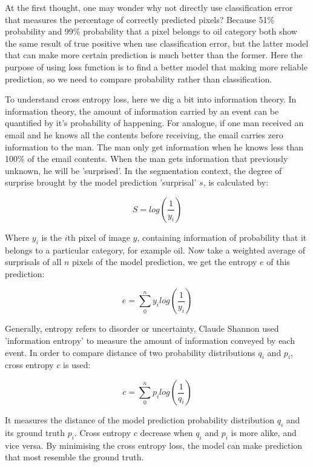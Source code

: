 At the first thought, one may wonder why not directly use classification error that measures the percentage of correctly predicted pixels? Because 51\% probability and 99\% probability that a pixel belongs to oil category both show the same result of true positive when use classification error, but the latter model that can make more certain prediction is much better than the former. Here the purpose of using loss function is to find a better model that making more reliable prediction, so we need to compare probability rather than classification.

To understand cross entropy loss, here we dig a bit into information theory. In information theory, the amount of information carried by an event can be quantified by it's probability of happening. For analogue, if one man received an email and he knows all the contents before receiving, the email carries zero information to the man. The man only get information when he knows less than 100\% of the email contents. When the man gets information that previously unknown, he will be 'surprised'. In the segmentation context, the degree of surprise brought by the model prediction 'surprisal' $s$, is calculated by:

\begin{equation}
S=log(\frac{1}{y_{i}})
\end{equation}

Where $y_{i}$ is the $i$th pixel of image $y$, containing information of probability that it belongs to a particular category, for example oil. Now take a weighted average of surprisals of all $n$ pixels of the model prediction, we get the entropy $e$ of this prediction:

\begin{equation}
e=\sum_{0}^{n}y_{i}log(\frac{1}{y_{i}})
\end{equation}

Generally, entropy refers to disorder or uncertainty, Claude Shannon \citep{shannon1948mathematical} used 'information entropy' to measure the amount of information conveyed by each event. In order to compare distance of two probability distributions $q_{i}$ and $p_{i}$, cross entropy $c$ is used:

\begin{equation}
c=\sum_{0}^{n}p_{i}log(\frac{1}{q_{i}})
\end{equation}

It measures the distance of the model prediction probability distribution $q_{i}$ and its ground truth $p_{i}$. Cross entropy $c$ decrease when $q_{i}$ and $p_{i}$ is more alike, and vice versa. By minimising the cross entropy loss, the model can make prediction that most resemble the ground truth. 


